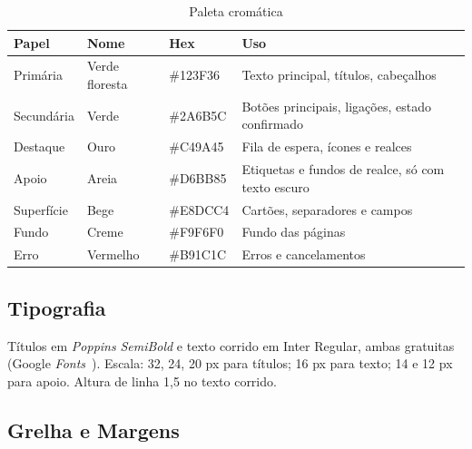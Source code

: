 \begin{table}[H]
    \centering
    \renewcommand{\arraystretch}{1.3}
    \begin{tabularx}{\textwidth}{@{}l X X X@{}}
        \toprule
        \textbf{Papel} & \textbf{Nome} & \textbf{Hex} & \textbf{Uso} \\
        \midrule

        Primária &
        Verde floresta &
        \#123F36 &
        Texto principal, títulos, cabeçalhos \\
        \midrule

        Secundária &
        Verde &
        \#2A6B5C &
        Botões principais, ligações, estado confirmado \\
        \midrule

        Destaque &
        Ouro &
        \#C49A45 &
        Fila de espera, ícones e realces \\
        \midrule

        Apoio &
        Areia &
        \#D6BB85 &
        Etiquetas e fundos de realce, só com texto escuro \\
        \midrule

        Superfície &
        Bege &
        \#E8DCC4 &
        Cartões, separadores e campos \\
        \midrule

        Fundo &
        Creme &
        \#F9F6F0 &
        Fundo das páginas \\
        \midrule

        Erro &
        Vermelho &
        \#B91C1C &
        Erros e cancelamentos \\

        \bottomrule
    \end{tabularx}
    \caption{Paleta cromática}
    \label{tab:paleta-cromatica}
\end{table}

\subsection{Tipografia}

Títulos em \textit{Poppins} \textit{SemiBold} e texto corrido em Inter Regular, ambas gratuitas (Google \textit{Fonts}~\cite{googlefonts}). Escala: 32, 24, 20 px para títulos; 16 px para texto; 14 e 12 px para apoio. Altura de linha 1,5 no texto corrido.

\subsection{Grelha e Margens}

